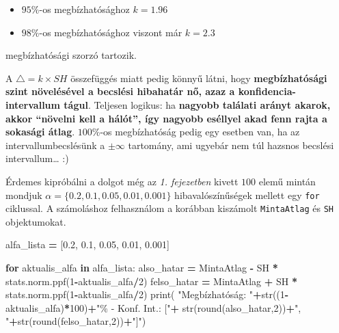 \documentclass[
]{book}
\newenvironment{Shaded}{\begin{snugshade}}{\end{snugshade}}
\newcommand{\BuiltInTok}[1]{#1}
\newcommand{\ControlFlowTok}[1]{\textcolor[rgb]{0.13,0.29,0.53}{\textbf{#1}}}
\newcommand{\DecValTok}[1]{\textcolor[rgb]{0.00,0.00,0.81}{#1}}
\newcommand{\FloatTok}[1]{\textcolor[rgb]{0.00,0.00,0.81}{#1}}
\newcommand{\KeywordTok}[1]{\textcolor[rgb]{0.13,0.29,0.53}{\textbf{#1}}}
\newcommand{\NormalTok}[1]{#1}
\newcommand{\OperatorTok}[1]{\textcolor[rgb]{0.81,0.36,0.00}{\textbf{#1}}}
\newcommand{\StringTok}[1]{\textcolor[rgb]{0.31,0.60,0.02}{#1}}
\providecommand{\tightlist}{%
  \setlength{\itemsep}{0pt}\setlength{\parskip}{0pt}}
\begin{document}
\begin{itemize}
\tightlist
\item
  \(95\%\)-os megbízhatósághoz \(k=1.96\)
\item
  \(98\%\)-os megbízhatósághoz viszont már \(k=2.3\)
\end{itemize}

megbízhatósági szorzó tartozik.

A \(\triangle = k \times SH\) összefüggés miatt pedig könnyű látni, hogy \textbf{megbízhatósági szint növelésével a becslési hibahatár nő, azaz a konfidencia-intervallum tágul}. Teljesen logikus: ha \textbf{nagyobb találati arányt akarok, akkor ``növelni kell a hálót'', így nagyobb eséllyel akad fenn rajta a sokasági átlag}.
\(100\%\)-os megbízhatóság pedig egy esetben van, ha az intervallumbecslésünk a \(\pm \infty\) tartomány, ami ugyebár nem túl hazsnos becslési intervallum\ldots{} :)

Érdemes kipróbálni a dolgot még az \emph{1. fejezetben} kivett \(100\) elemű mintán mondjuk \(\alpha=\{0.2,0.1,0.05,0.01,0.001\}\) hibavalószínűségek mellett egy \texttt{for} ciklussal.
A számoláshoz felhasználom a korábban kiszámolt \texttt{MintaAtlag} és \texttt{SH} objektumokat.

\begin{Shaded}
\begin{Highlighting}[]
\NormalTok{alfa\_lista }\OperatorTok{=}\NormalTok{ [}\FloatTok{0.2}\NormalTok{, }\FloatTok{0.1}\NormalTok{, }\FloatTok{0.05}\NormalTok{, }\FloatTok{0.01}\NormalTok{, }\FloatTok{0.001}\NormalTok{]}

\ControlFlowTok{for}\NormalTok{ aktualis\_alfa }\KeywordTok{in}\NormalTok{ alfa\_lista:}
\NormalTok{  also\_hatar }\OperatorTok{=}\NormalTok{ MintaAtlag }\OperatorTok{{-}}\NormalTok{ SH }\OperatorTok{*}\NormalTok{ stats.norm.ppf(}\DecValTok{1}\OperatorTok{{-}}\NormalTok{aktualis\_alfa}\OperatorTok{/}\DecValTok{2}\NormalTok{)}
\NormalTok{  felso\_hatar }\OperatorTok{=}\NormalTok{ MintaAtlag }\OperatorTok{+}\NormalTok{ SH }\OperatorTok{*}\NormalTok{ stats.norm.ppf(}\DecValTok{1}\OperatorTok{{-}}\NormalTok{aktualis\_alfa}\OperatorTok{/}\DecValTok{2}\NormalTok{)}
  \BuiltInTok{print}\NormalTok{(}
    \StringTok{"Megbízhatóság: "}\OperatorTok{+}\BuiltInTok{str}\NormalTok{((}\DecValTok{1}\OperatorTok{{-}}\NormalTok{aktualis\_alfa)}\OperatorTok{*}\DecValTok{100}\NormalTok{)}\OperatorTok{+}\StringTok{"\% {-} Konf. Int.: ["}\OperatorTok{+}
    \BuiltInTok{str}\NormalTok{(}\BuiltInTok{round}\NormalTok{(also\_hatar,}\DecValTok{2}\NormalTok{))}\OperatorTok{+}\StringTok{", "}\OperatorTok{+}\BuiltInTok{str}\NormalTok{(}\BuiltInTok{round}\NormalTok{(felso\_hatar,}\DecValTok{2}\NormalTok{))}\OperatorTok{+}\StringTok{"]"}\NormalTok{)}
\end{Highlighting}
\end{Shaded}
\end{document}
